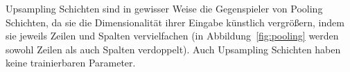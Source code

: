 Upsampling Schichten sind in gewisser Weise die Gegenspieler von
Pooling Schichten, da sie die Dimensionalit\"at ihrer Eingabe
k\"unstlich vergr\"o{\ss}ern, indem sie jeweils Zeilen und
Spalten vervielfachen (in Abbildung~\ref{fig:pooling} werden sowohl
Zeilen als auch Spalten verdoppelt).
Auch Upsampling Schichten haben keine trainierbaren Parameter.
